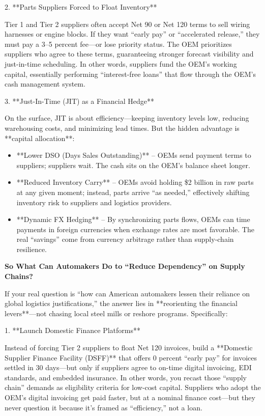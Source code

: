 2. **Parts Suppliers Forced to Float Inventory**

   Tier 1 and Tier 2 suppliers often accept Net 90 or Net 120 terms to sell wiring harnesses or engine blocks. If they want “early pay” or “accelerated release,” they must pay a 3–5 percent fee—or lose priority status. The OEM prioritizes suppliers who agree to these terms, guaranteeing stronger forecast visibility and just-in-time scheduling. In other words, suppliers fund the OEM’s working capital, essentially performing “interest-free loans” that flow through the OEM’s cash management system.

3. **Just-In-Time (JIT) as a Financial Hedge**

   On the surface, JIT is about efficiency—keeping inventory levels low, reducing warehousing costs, and minimizing lead times. But the hidden advantage is **capital allocation**:

   \begin{itemize}
    \item **Lower DSO (Days Sales Outstanding)** –  OEMs send payment terms to suppliers; suppliers wait. The cash sits on the OEM’s balance sheet longer.
    \item **Reduced Inventory Carry** –  OEMs avoid holding \$2 billion in raw parts at any given moment; instead, parts arrive “as needed,” effectively shifting inventory risk to suppliers and logistics providers.
    \item **Dynamic FX Hedging** –  By synchronizing parts flows, OEMs can time payments in foreign currencies when exchange rates are most favorable. The real “savings” come from currency arbitrage rather than supply-chain resilience.
   \end{itemize}

\textbf{So What Can Automakers Do to “Reduce Dependency” on Supply Chains?}

If your real question is “how can American automakers lessen their reliance on global logistics justifications,” the answer lies in **reorienting the financial levers**—not chasing local steel mills or reshore programs. Specifically:

1. **Launch Domestic Finance Platforms**

   Instead of forcing Tier 2 suppliers to float Net 120 invoices, build a **Domestic Supplier Finance Facility (DSFF)** that offers 0 percent “early pay” for invoices settled in 30 days—but only if suppliers agree to on-time digital invoicing, EDI standards, and embedded insurance. In other words, you recast those “supply chain” demands as eligibility criteria for low-cost capital. Suppliers who adopt the OEM’s digital invoicing get paid faster, but at a nominal finance cost—but they never question it because it’s framed as “efficiency,” not a loan.

